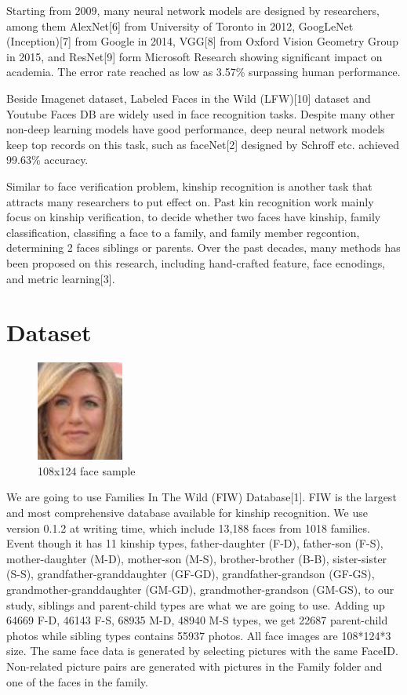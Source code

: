 \documentclass{article}
\begin{document}
Starting from 2009, many neural network models are designed by researchers,
among them AlexNet[6] from University of Toronto in 2012, GoogLeNet
(Inception)[7] from Google in 2014, VGG[8] from Oxford Vision Geometry Group in
2015, and ResNet[9] form Microsoft Research showing significant impact on
academia. The error rate reached as low as 3.57\% surpassing human performance.

Beside Imagenet dataset, Labeled Faces in the Wild (LFW)[10] dataset and
Youtube Faces DB are widely used in face recognition tasks. Despite many other non-deep learning models have good performance, deep neural network models keep top records on this task, such as faceNet[2] designed by Schroff etc. achieved 99.63\% accuracy.

Similar to face verification problem, kinship recognition is another task that
attracts many researchers to put effect on.  Past kin recognition work mainly
focus on kinship verification, to decide whether two faces have kinship, family
classification, classifing a face to a family, and family member regcontion,
determining 2 faces siblings or parents. Over the past decades, many methods
has been proposed on this research, including hand-crafted feature, face
ecnodings, and metric learning[3].

\section{Dataset}

\begin{figure}
\caption{108x124 face sample}
\includegraphics{img/P00241_face0}
\end{figure}

We are going to use Families In The Wild (FIW) Database[1]. FIW is the largest
and most comprehensive database available for kinship recognition. We use
version 0.1.2 at writing time, which include 13,188 faces from 1018 families.
Event though it has 11 kinship types, father-daughter (F-D), father-son (F-S),
mother-daughter (M-D), mother-son (M-S), brother-brother (B-B), sister-sister
(S-S), grandfather-granddaughter (GF-GD), grandfather-grandson (GF-GS),
grandmother-granddaughter (GM-GD), grandmother-grandson (GM-GS), to our study,
siblings and parent-child types are what we are going to use. Adding up 64669
F-D, 46143 F-S, 68935 M-D, 48940 M-S types, we get 22687 parent-child photos
while sibling types contains 55937 photos. All face images are 108*124*3 size.
The same face data is generated by selecting pictures with the same FaceID.
Non-related picture pairs are generated with pictures in the Family folder and
one of the faces in the family.
\end{document}
